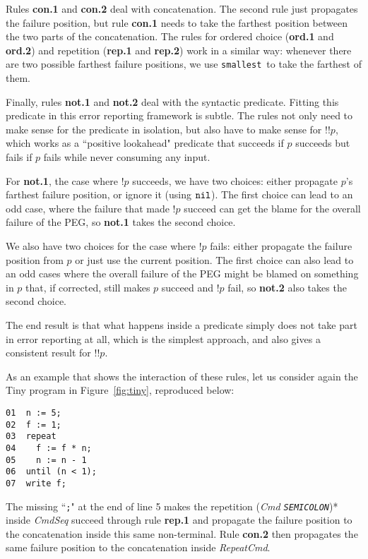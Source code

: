 \documentclass[3p,12pt,singlecolumn]{elsarticle}
\newcommand{\Suf}{{\tt smallest}}
\newcommand{\Nil}{{\tt nil}}
\begin{document}
Rules {\bf con.1} and {\bf con.2} deal with concatenation.
The second rule just propagates the failure position, but
rule {\bf con.1} needs to take the farthest position
between the two parts of the concatenation. The rules
for ordered choice ({\bf ord.1} and {\bf ord.2}) and
repetition ({\bf rep.1} and {\bf rep.2}) work in
a similar way: whenever there are two possible farthest
failure positions, we use \Suf\ to take the farthest of
them.

Finally, rules {\bf not.1} and {\bf not.2} deal with
the syntactic predicate. Fitting this predicate in
this error reporting framework is subtle. The rules
not only need to make sense for the predicate in
isolation, but also have to make sense for $!!p$, which
works as a ``positive lookahead" predicate that succeeds
if $p$ succeeds but fails if $p$ fails while never
consuming any input.

For {\bf not.1}, the case where $!p$ succeeds, we have two
choices: either propagate $p$'s farthest failure position, or
ignore it (using $\Nil$). The first choice can lead to an
odd case, where the failure that made $!p$ succeed can get
the blame for the overall failure of the PEG, so
{\bf not.1} takes the second choice.

We also have two choices for the
case where $!p$ fails: either propagate the failure position
from $p$ or just use the current position. The first choice
can also lead to an odd cases where the overall failure
of the PEG might be blamed on something in $p$ that, if
corrected, still makes $p$ succeed and $!p$ fail, so
{\bf not.2} also takes the second choice.

The end result is that what happens inside a predicate simply
does not take part in error reporting at all, which is the
simplest approach, and also gives a consistent result for
$!!p$.

As an example that shows the interaction of these
rules, let us consider again the Tiny program in
Figure~\ref{fig:tiny}, reproduced below:

\begin{verbatim}
01  n := 5;
02  f := 1;
03  repeat
04    f := f * n;
05    n := n - 1
06  until (n < 1);
07  write f;
\end{verbatim}

The missing ``{\tt ;}" at the end of line 5
makes the repetition ({\it Cmd {\tt SEMICOLON}})*
inside {\it CmdSeq} succeed through rule {\bf rep.1}
and propagate the failure position to the concatenation
inside this same non-terminal. Rule {\bf con.2} then
propagates the same failure position to the concatenation
inside {\it RepeatCmd}.
\end{document}
